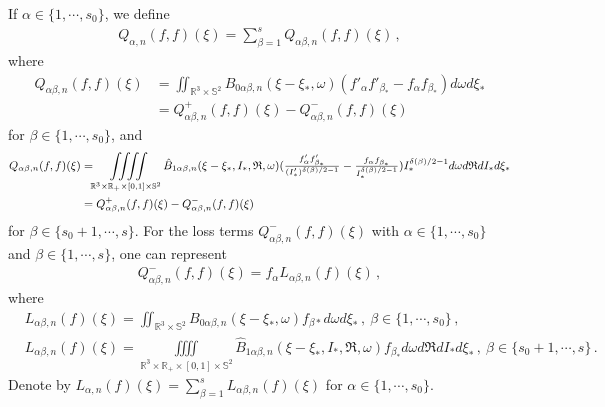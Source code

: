\documentclass[reqno,11pt]{amsart}
\numberwithin{equation}{section}
\def\R{\mathbb{R}}
\begin{document}
If $\alpha \in \{1,\cdots , s_0\}$, we define
\begin{equation*}
  \begin{aligned}
    Q_{\alpha, n} (f,f) (\xi) = \sum_{\beta = 1}^{s} Q_{\alpha \beta, n} (f, f) (\xi) \,,
  \end{aligned}
\end{equation*}
where
\begin{equation*}
  \begin{aligned}
    Q_{\alpha \beta, n} (f, f) (\xi) & = \iint_{\R^3 \times \mathbb{S}^2 } B_{0\alpha \beta ,n} (\xi - \xi_*, \omega) (f'_\alpha f'_{\beta_*}- f_\alpha f_{\beta_*})d\omega d\xi_* \\
    & = Q_{\alpha \beta, n}^+ (f, f) (\xi) - Q_{\alpha \beta, n}^- (f, f) (\xi)
  \end{aligned}
\end{equation*}
for $\beta \in \{ 1, \cdots, s_0 \}$, and
\begin{equation*}{\small
  \begin{aligned}
    Q_{\alpha \beta, n} (f,f) (\xi) & = \iiiint \limits_{\R^3\times \R_+ \times [0,1] \times \mathbb{S}^2} \hat{B}_{1\alpha \beta ,n} (\xi - \xi_*, I_*, \mathfrak{R}, \omega) (\tfrac{f'_\alpha f'_{\beta_*}}{(I'_* )^{\delta(\beta)/2-1}} - \tfrac{f_\alpha f_{\beta_*}}{ I_* ^{\delta(\beta)/2-1}}) I_*^{\delta(\beta)/2-1} d\omega d \mathfrak{R} dI_* d\xi_* \\
    & = Q_{\alpha \beta, n}^+ (f, f) (\xi) - Q_{\alpha \beta, n}^- (f, f) (\xi)
  \end{aligned}}
\end{equation*}
for $\beta \in \{ s_0 + 1, \cdots, s \}$. For the loss terms $Q_{\alpha \beta, n}^- (f,f) (\xi)$ with $\alpha \in \{ 1, \cdots, s_0 \}$ and $\beta \in \{ 1 , \cdots , s \}$, one can represent
\begin{equation*}
  \begin{aligned}
    Q_{\alpha \beta, n}^- (f,f) (\xi) = f_\alpha L_{\alpha \beta, n} (f) (\xi) \,,
  \end{aligned}
\end{equation*}
where
\begin{equation*}
  \begin{aligned}
    & L_{\alpha \beta, n} (f) (\xi) = \iint_{\R^3 \times \mathbb{S}^2 } B_{0\alpha \beta ,n} (\xi - \xi_*, \omega) f_{\beta *} d \omega d \xi_* \,, \ \beta \in \{ 1, \cdots, s_0 \} \,, \\
    & L_{\alpha \beta, n} (f) (\xi) = \iiiint \limits_{\R^3\times \R_+ \times [0,1] \times \mathbb{S}^2} \hat{B}_{1\alpha \beta ,n} (\xi - \xi_*, I_*, \mathfrak{R}, \omega) f_{\beta_*} d \omega d \mathfrak{R} dI_* d\xi_* \,, \ \beta \in \{ s_0 + 1, \cdots, s \} \,.
  \end{aligned}
\end{equation*}
Denote by $L_{\alpha, n} (f) (\xi) = \sum_{\beta = 1}^{s} L_{\alpha \beta, n} (f) (\xi)$ for $\alpha \in \{ 1, \cdots, s_0 \}$.
\end{document}
